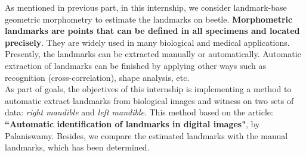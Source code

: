 As mentioned in previous part, in this internship, we consider landmark-base geometric morphometry to estimate the landmarks on beetle. \textbf{Morphometric landmarks are points that can be defined in all specimens  and located precisely}\cite{palaniswamy2010automatic}. They are widely used in many biological and medical applications. Presently, the landmarks can be extracted manually or automatically. Automatic extraction of landmarks can be finished by applying other ways such as recognition (cross-correlation), shape analysis, etc.\\[0.2cm]
As part of goals, the objectives of this internship is implementing a method to automatic extract landmarks from biological images and witness on two sets of data: \textit{right mandible} and \textit{left mandible}. This method based on the article: \textbf{``Automatic identification of landmarks in digital images"}, by Palaniswamy\cite{palaniswamy2010automatic}. Besides, we compare the estimated landmarks with the manual landmarks, which has been determined.






























